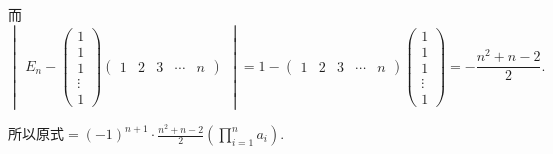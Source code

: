 \documentclass[UTF8,12pt,a4paper,fontset=fandol]{ctexart}
\begin{document}
\begin{solve}
            而 \[ \begin{vmatrix}E_n-\begin{pmatrix}
                        1 \\1\\1\\\vdots\\1
                    \end{pmatrix}\begin{pmatrix}1 & 2 & 3 & \cdots & n\end{pmatrix}\end{vmatrix}
                =1-\begin{pmatrix}1 & 2 & 3 & \cdots & n\end{pmatrix}
                \begin{pmatrix}1 \\ 1 \\ 1 \\ \vdots \\ 1\end{pmatrix}
                =-\frac{n^2+n-2}{2}. \]

            所以原式$\displaystyle =(-1)^{n+1} \cdot \frac{n^2+n-2}{2} \left(\prod_{i=1}^na_i \right)$.
\end{solve}
\end{document}

